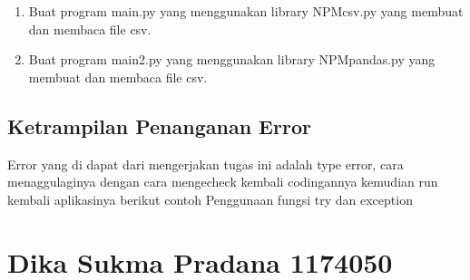 \begin{enumerate}
	
	
	\item Buat program main.py yang menggunakan library NPMcsv.py yang membuat dan membaca file csv.
	
	
	
	\item Buat program main2.py yang menggunakan library NPMpandas.py yang membuat dan membaca file csv.
	
	
	
\end{enumerate}

\subsection{Ketrampilan Penanganan Error}
Error yang di dapat dari mengerjakan tugas ini adalah type error, cara menaggulaginya dengan cara mengecheck kembali codingannya
kemudian run kembali aplikasinya
berikut contoh Penggunaan fungsi try dan exception


\section{Dika Sukma Pradana 1174050}
